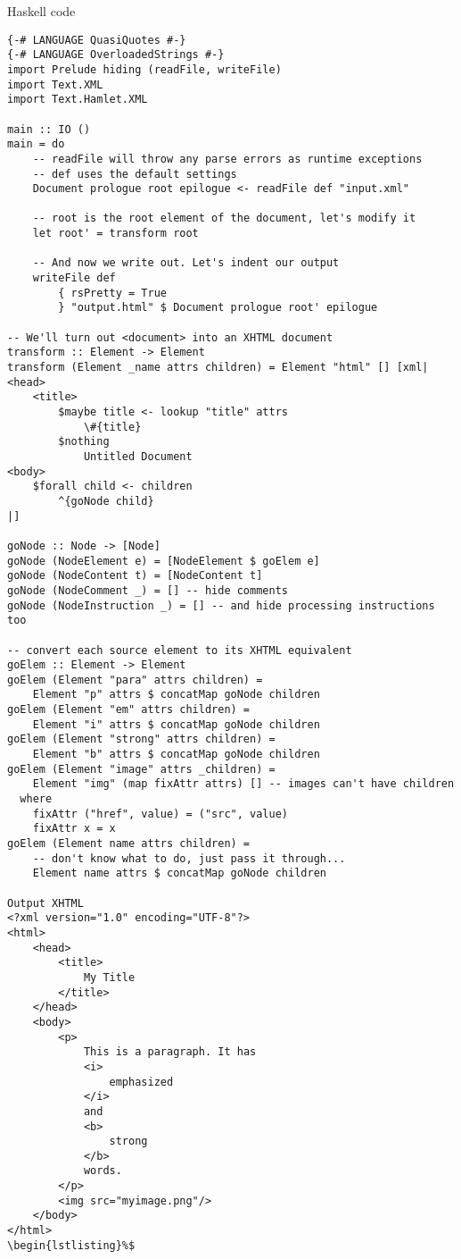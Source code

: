 Haskell code
\begin{lstlisting}
{-# LANGUAGE QuasiQuotes #-}
{-# LANGUAGE OverloadedStrings #-}
import Prelude hiding (readFile, writeFile)
import Text.XML
import Text.Hamlet.XML

main :: IO ()
main = do
    -- readFile will throw any parse errors as runtime exceptions
    -- def uses the default settings
    Document prologue root epilogue <- readFile def "input.xml"

    -- root is the root element of the document, let's modify it
    let root' = transform root

    -- And now we write out. Let's indent our output
    writeFile def
        { rsPretty = True
        } "output.html" $ Document prologue root' epilogue

-- We'll turn out <document> into an XHTML document
transform :: Element -> Element
transform (Element _name attrs children) = Element "html" [] [xml|
<head>
    <title>
        $maybe title <- lookup "title" attrs
            \#{title}
        $nothing
            Untitled Document
<body>
    $forall child <- children
        ^{goNode child}
|]

goNode :: Node -> [Node]
goNode (NodeElement e) = [NodeElement $ goElem e]
goNode (NodeContent t) = [NodeContent t]
goNode (NodeComment _) = [] -- hide comments
goNode (NodeInstruction _) = [] -- and hide processing instructions too

-- convert each source element to its XHTML equivalent
goElem :: Element -> Element
goElem (Element "para" attrs children) =
    Element "p" attrs $ concatMap goNode children
goElem (Element "em" attrs children) =
    Element "i" attrs $ concatMap goNode children
goElem (Element "strong" attrs children) =
    Element "b" attrs $ concatMap goNode children
goElem (Element "image" attrs _children) =
    Element "img" (map fixAttr attrs) [] -- images can't have children
  where
    fixAttr ("href", value) = ("src", value)
    fixAttr x = x
goElem (Element name attrs children) =
    -- don't know what to do, just pass it through...
    Element name attrs $ concatMap goNode children

Output XHTML
<?xml version="1.0" encoding="UTF-8"?>
<html>
    <head>
        <title>
            My Title
        </title>
    </head>
    <body>
        <p>
            This is a paragraph. It has 
            <i>
                emphasized
            </i>
            and 
            <b>
                strong
            </b>
            words.
        </p>
        <img src="myimage.png"/>
    </body>
</html>
\begin{lstlisting}%$


\end{lstlisting}
